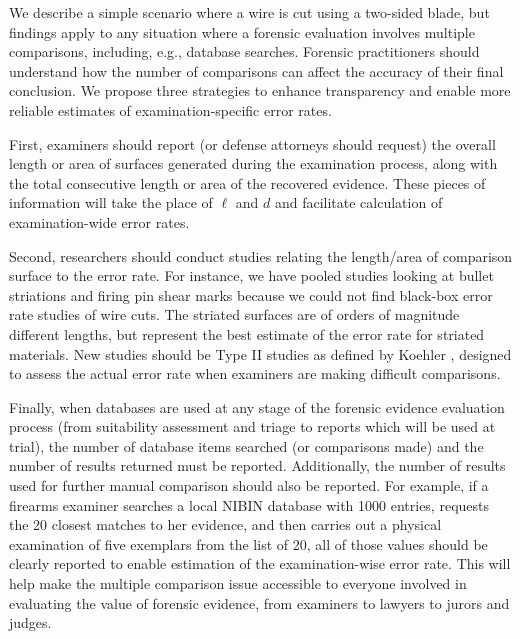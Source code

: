 \documentclass[9pt,twocolumn,twoside]{pnas-new}\usepackage[]{graphicx}\usepackage[dvipsnames]{xcolor}
\begin{document}
We describe a simple scenario where a wire is cut using a two-sided blade, but findings apply to any situation where a forensic evaluation involves multiple comparisons, including, e.g., database searches.  Forensic practitioners should understand how the number of comparisons can affect the accuracy of their final conclusion. We propose three strategies to enhance transparency and enable more reliable estimates of examination-specific error rates.

First, examiners should report (or defense attorneys should request) the overall length or area of surfaces generated during the examination process, along with the total consecutive length or area of the recovered evidence.
These pieces of information will take the place of $\ell$ and $d$ and facilitate calculation of examination-wide error rates.

Second, researchers should conduct studies relating the length/area of comparison surface to the error rate.
For instance, we have pooled studies looking at bullet striations and firing pin shear marks because we could not find black-box error rate studies of wire cuts.
The striated surfaces are of orders of magnitude different lengths, but represent the best estimate of the error rate for striated materials.
New studies should be Type II studies as defined by Koehler \citep{koehlerIntuitiveErrorRate2017a}, designed to assess the actual error rate when examiners are making difficult comparisons.

Finally, when databases are used at any stage of the forensic evidence evaluation process (from suitability assessment and triage to reports which will be used at trial), the number of database items searched (or comparisons made) and the number of results returned must be reported.
Additionally, the number of results used for further manual comparison should also be reported.
For example, if a firearms examiner searches a local NIBIN database with 1000 entries, requests the 20 closest matches to her evidence, and then carries out a physical examination of five exemplars from the list of 20, all of those values should be clearly reported to enable estimation of the examination-wise error rate.
This will help make the multiple comparison issue accessible to everyone involved in evaluating the value of forensic evidence, from examiners to lawyers to jurors and judges.
\end{document}
